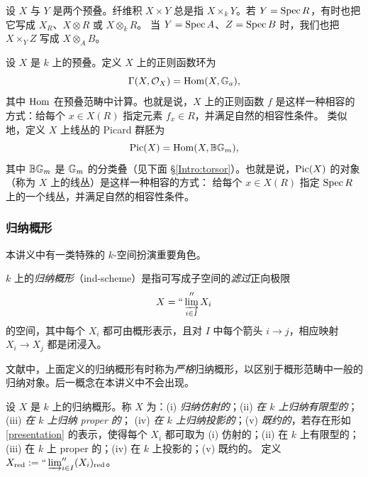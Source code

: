设 $X$ 与 $Y$ 是两个预叠。纤维积 $X\times Y$ 总是指 $X\times_kY$。若 $Y=\operatorname{Spec} R$，有时也把它写成 $X_R$、$X\otimes R$ 或 $X\otimes_kR$。
当 $Y=\operatorname{Spec} A$、$Z=\operatorname{Spec} B$ 时，我们也把 $X\times_YZ$ 写成 $X\otimes_AB$。

设 $X$ 是 $k$ 上的预叠。定义 $X$ 上的正则函数环为
\begin{equation}\label{reg fun}
\Gamma(X,{\mathcal O}_X)={\operatorname{Hom}}(X, {\mathbb G}_a),
\end{equation}
其中 ${\operatorname{Hom}}$ 在预叠范畴中计算。也就是说，$X$ 上的正则函数 $f$ 是这样一种相容的方式：给每个 $x\in X(R)$ 指定元素 $f_x\in R$，并满足自然的相容性条件。
类似地，定义 $X$ 上线丛的 Picard 群胚为
\begin{equation}\label{Pic line}
{\operatorname{Pic}}(X)={\operatorname{Hom}}(X,{\mathbb B}{\mathbb G}_m),
\end{equation}
其中 ${\mathbb B}{\mathbb G}_m$ 是 ${\mathbb G}_m$ 的分类叠（见下面 \S\ref{Intro:torsor}）。也就是说，${\operatorname{Pic}}(X)$ 的对象（称为 $X$ 上的线丛）是这样一种相容的方式：
给每个 $x\in X(R)$ 指定 $\operatorname{Spec} R$ 上的一个线丛，并满足自然的相容性条件。

\subsubsection{归纳概形}\label{Intro:Indsch}

本讲义中有一类特殊的 $k$-空间扮演重要角色。

\begin{dfn}\label{ind-sch}
$k$ 上的\emph{归纳概形}（ind-scheme）是指可写成子空间的\emph{滤过}正向极限
\begin{equation}\label{presentation}
X=``\varinjlim''_{i\in I}X_i
\end{equation}
的空间，其中每个 $X_i$ 都可由概形表示，且对 $I$ 中每个箭头 $i\to j$，相应映射 $X_i\to X_j$ 都是闭浸入。
\end{dfn}

\begin{rmk}
文献中，上面定义的归纳概形有时称为\emph{严格}归纳概形，以区别于概形范畴中一般的归纳对象。后一概念在本讲义中不会出现。
\end{rmk}

\begin{dfn}
设 $X$ 是 $k$ 上的归纳概形。称 $X$ 为：(i) \emph{归纳仿射的}；(ii) \emph{在 $k$ 上归纳有限型的}；(iii) \emph{在 $k$ 上归纳 proper 的}；
(iv) \emph{在 $k$ 上归纳投影的}；(v) \emph{既约的}，若存在形如 \eqref{presentation} 的表示，使得每个 $X_i$ 都可取为
(i) 仿射的；(ii) 在 $k$ 上有限型的；(iii) 在 $k$ 上 proper 的；(iv) 在 $k$ 上投影的；(v) 既约的。
定义 $X_{\operatorname{red}}:=``\varinjlim''_{i\in I}(X_i)_{\operatorname{red}}$。
\end{dfn}

